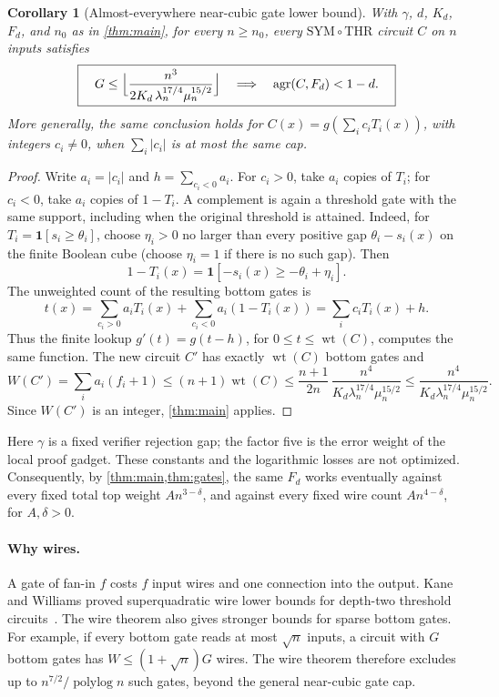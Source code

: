 \documentclass[11pt,letterpaper]{article}
\newtheorem{corollary}[theorem]{Corollary}
\theoremstyle{definition}
\theoremstyle{remark}
\newcommand{\THR}{\mathrm{THR}}
\newcommand{\SYM}{\mathrm{SYM}}
\newcommand{\polylog}{\operatorname{polylog}}
\newcommand{\agr}{\operatorname{agr}}
\newcommand{\ind}{\mathbf 1}
\newcommand{\topwt}{\operatorname{wt}}
\begin{document}
\begin{corollary}[Almost-everywhere near-cubic gate lower bound]
\label{thm:gates}\label{cor:gates}
With \(\gamma\), \(d\), \(K_d\), \(F_d\), and \(n_0\) as in
\cref{thm:main}, for every \(n\ge n_0\), every \(\SYM\circ\THR\)
circuit \(C\) on \(n\) inputs satisfies
\[
 \boxed{\quad
 G\le\Bigl\lfloor\frac{n^3}{2K_d\,\lambda_n^{17/4}\mu_n^{15/2}}\Bigr\rfloor
 \quad\Longrightarrow\quad \agr(C,F_d)<1-d .\quad}
\]
More generally, the same conclusion holds for
\(C(x)=g(\sum_i c_iT_i(x))\), with integers \(c_i\ne0\), when
\(\sum_i|c_i|\) is at most the same cap.
\end{corollary}
\begin{proof}
Write \(a_i=|c_i|\) and \(h=\sum_{c_i<0}a_i\). For \(c_i>0\),
take \(a_i\) copies of \(T_i\); for \(c_i<0\), take \(a_i\)
copies of \(1-T_i\). A complement is again a threshold gate with
the same support, including when the original threshold is attained.
Indeed, for \(T_i=\ind[s_i\ge\theta_i]\), choose \(\eta_i>0\)
no larger than every positive gap \(\theta_i-s_i(x)\) on the finite
Boolean cube (choose \(\eta_i=1\) if there is no such gap). Then
\[
 1-T_i(x)=\ind[-s_i(x)\ge-\theta_i+\eta_i].
\]
The unweighted count of the resulting bottom gates is
\[
 t(x)=\sum_{c_i>0}a_iT_i(x)+\sum_{c_i<0}a_i(1-T_i(x))
     =\sum_i c_iT_i(x)+h.
\]
Thus the finite lookup \(g'(t)=g(t-h)\), for
\(0\le t\le\topwt(C)\), computes the same function. The new
circuit \(C'\) has exactly \(\topwt(C)\) bottom gates and
\[
 W(C')=\sum_i a_i(f_i+1)\le(n+1)\topwt(C)
 \le\frac{n+1}{2n}\,
       \frac{n^4}{K_d\lambda_n^{17/4}\mu_n^{15/2}}
 \le\frac{n^4}{K_d\lambda_n^{17/4}\mu_n^{15/2}}.
\]
Since \(W(C')\) is an integer, \cref{thm:main} applies.
\end{proof}

Here \(\gamma\) is a fixed verifier rejection gap; the factor five
is the error weight of the local proof gadget. These constants and
the logarithmic losses are not optimized.
Consequently, by \cref{thm:main,thm:gates}, the same \(F_d\) works eventually against every fixed
total top weight \(An^{3-\delta}\), and against every fixed wire
count \(An^{4-\delta}\), for \(A,\delta>0\). 

\paragraph{Why wires.}
A gate of fan-in \(f\) costs \(f\) input wires and one connection
into the output. Kane and Williams proved superquadratic wire lower
bounds for depth-two threshold circuits~\cite{KW16}.
The wire theorem also gives stronger bounds for sparse bottom gates.
For example, if every bottom gate reads at most \(\sqrt n\) inputs,
a circuit with \(G\) bottom gates has
\(W\le(1+\sqrt n)G\) wires. The wire theorem therefore excludes
up to \(n^{7/2}/\polylog n\) such gates, beyond the general
near-cubic gate cap.
\end{document}
